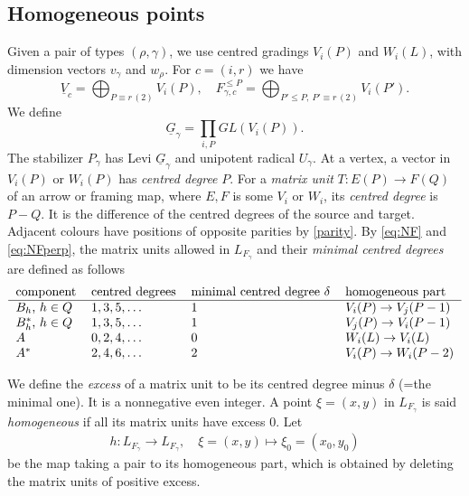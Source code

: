 \documentclass[11pt,reqno]{amsart}
\theoremstyle{definition}
\theoremstyle{remark}
\def\dG{\underline G}
\def\dV{\underline V}
\begin{document}
\subsection{Homogeneous points}\label{subsec:graded}
Given a pair of types $(\rho,\gamma)$, we
use centred gradings $V_i(P)$ and $W_i(L)$, with dimension vectors
$v_\gamma$ and $w_\rho$. For $c=(i,r)$ we have
$$\dV_c=\bigoplus_{P\equiv r\, (2)}V_i(P)
,\quad
F_{\gamma,c}^{\leqslant P}=\bigoplus_{P'\leqslant P,\ P'\equiv r\, (2)}V_i(P').$$
We define
$$\dG_\gamma=\prod_{i,P}GL(V_i(P)).$$
The stabilizer $P_\gamma$ has Levi
$\dG_\gamma$ and unipotent radical $U_\gamma$.
At a vertex, a vector in $V_i(P)$ or $W_i(P)$ has \emph{centred degree} $P$.
For a \emph{matrix unit} $T:E(P)\to F(Q)$ of an arrow or framing map, where $E,F$ is some $V_i$ or $W_i$,
its \emph{centred degree}  is $P-Q$. It is the difference of the centred degrees of the source and target. 
Adjacent colours have positions of opposite parities by \eqref{parity}. By \eqref{eq:NF} and \eqref{eq:NFperp}, the matrix
units allowed in $L_{F_\gamma}$ and their \emph{minimal centred degrees} are defined as follows
\begin{equation}\label{tableau}
\begin{tabular}{llll}
component &  centred degrees & minimal centred degree $\delta$ & homogeneous part\\\hline
$B_h$, $h\in Q$ & $1,3,5,\dots$ & $1$ & $V_i(P)\to V_j(P-1)$\\
$B^*_h$, $h\in Q$ & $1,3,5,\dots$ & $1$ & $V_j(P)\to V_i(P-1)$\\
$A$ & $0,2,4,\dots$ & $0$ & $W_i(L)\to V_i(L)$\\
$A^*$ & $2,4,6,\dots$ & $2$ & $V_i(P)\to W_i(P-2)$
\end{tabular}
\end{equation}

We define the \emph{excess} of a matrix unit to be its centred degree minus $\delta$ (=the minimal one). 
It is a nonnegative even integer. A point 
$\xi=(x,y)$ in $L_{F_\gamma}$ 
is said \emph{homogeneous} if all its matrix units have excess $0$.
Let 
\begin{align}\label{h} 
h:L_{F_\gamma}\to L_{F_\gamma},\quad 
\xi=(x,y)\mapsto\xi_0=(x_0,y_0)
\end{align}
be the map taking a pair to its homogeneous part, which 
is obtained by deleting the matrix units of positive excess.
\end{document}
